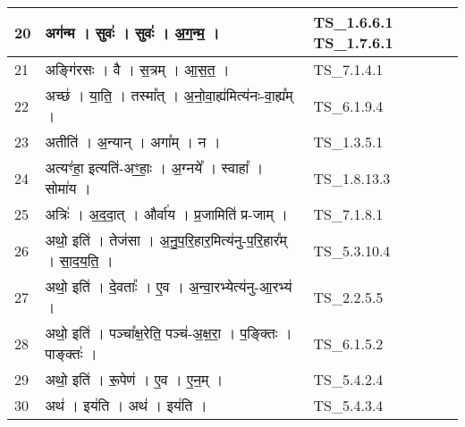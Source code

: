 \documentclass[17pt]{extarticle}
\begin{document}
\begin{longtable}{||p{0.4in}||p{4.9in}||p{0.9in}||}
    \hline
        
    20 & अग॑न्म   ।   सुवः॑   ।   सुवः॑   ।   अ॒ग॒न्म॒   ।    & TS\_1.6.6.1 TS\_1.7.6.1       \\
    
    \hline
        
    21 & अङ्गि॑रसः   ।   वै   ।   स॒त्रम्   ।   आ॒स॒त॒   ।    & TS\_7.1.4.1       \\
    
    \hline
        
    22 & अच्छ॑   ।   या॒ति॒   ।   तस्मा᳚त्   ।   अ॒नो॒वा॒ह्य॑मित्य॑नः{-}वा॒ह्य᳚म्   ।    & TS\_6.1.9.4       \\
    
    \hline
        
    23 & अतीति॑   ।   अ॒न्यान्   ।   अगा᳚म्   ।   न   ।    & TS\_1.3.5.1       \\
    
    \hline
        
    24 & अत्यꣳ॑हा॒ इत्यति॑{-}अꣳ॒॒हाः॒   ।   अ॒ग्नये᳚   ।   स्वाहा᳚   ।   सोमा॑य   ।    & TS\_1.8.13.3       \\
    
    \hline
        
    25 & अत्रिः॑   ।   अ॒द॒दा॒त्   ।   और्वा॑य   ।   प्र॒जामिति॑ प्र{-}जाम्   ।    & TS\_7.1.8.1       \\
    
    \hline
        
    26 & अथो॒ इति॑   ।   तेज॑सा   ।   अ॒नु॒प॒रि॒हार॒मित्य॑नु{-}प॒रि॒हार᳚म्   ।   सा॒द॒य॒ति॒   ।    & TS\_5.3.10.4       \\
    
    \hline
        
    27 & अथो॒ इति॑   ।   दे॒वताः᳚   ।   ए॒व   ।   अ॒न्वा॒रभ्येत्य॑नु{-}आ॒रभ्य॑   ।    & TS\_2.2.5.5       \\
    
    \hline
        
    28 & अथो॒ इति॑   ।   पञ्चा᳚क्ष॒रेति॒ पञ्च॑{-}अ॒क्ष॒रा॒   ।   प॒ङ्क्तिः   ।   पाङ्क्तः॑   ।    & TS\_6.1.5.2       \\
    
    \hline
        
    29 & अथो॒ इति॑   ।   रू॒पेण॑   ।   ए॒व   ।   ए॒न॒म्   ।    & TS\_5.4.2.4       \\
    
    \hline
        
    30 & अथ॑   ।   इय॑ति   ।   अथ॑   ।   इय॑ति   ।    & TS\_5.4.3.4       \\
    

\end{longtable}
\end{document}
